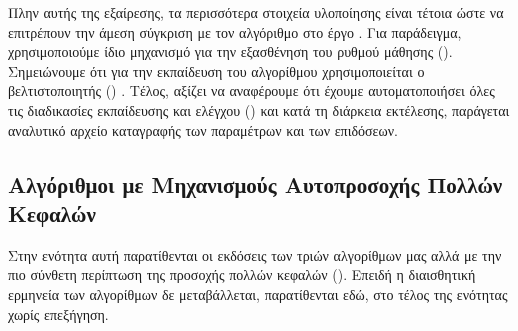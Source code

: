 Πλην αυτής της εξαίρεσης, τα περισσότερα στοιχεία υλοποίησης είναι τέτοια ώστε να επιτρέπουν την άμεση σύγκριση με τον αλγόριθμο στο έργο \cite{sabour2017dynamic}. Για παράδειγμα, χρησιμοποιούμε ίδιο μηχανισμό για την εξασθένηση του ρυθμού μάθησης (). Σημειώνουμε ότι για την εκπαίδευση του αλγορίθμου χρησιμοποιείται ο βελτιστοποιητής () . Τέλος, αξίζει να αναφέρουμε ότι έχουμε αυτοματοποιήσει όλες τις διαδικασίες εκπαίδευσης και ελέγχου () και κατά τη διάρκεια εκτέλεσης, παράγεται αναλυτικό αρχείο καταγραφής των παραμέτρων και των επιδόσεων.

\subsection{Αλγόριθμοι με Μηχανισμούς Αυτοπροσοχής Πολλών Κεφαλών}
Στην ενότητα αυτή παρατίθενται οι εκδόσεις των τριών αλγορίθμων μας αλλά με την πιο σύνθετη περίπτωση της προσοχής πολλών κεφαλών (). Επειδή η διαισθητική ερμηνεία των αλγορίθμων δε μεταβάλλεται, παρατίθενται εδώ, στο τέλος της ενότητας χωρίς επεξήγηση.

